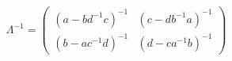\begin{equation}
\Lambda^{-1}= \left(
\begin{array}{cc}
(a-bd^{-1}c)^{-1} & (c-db^{-1}a)^{-1}\\
(b-ac^{-1}d)^{-1} & (d-ca^{-1}b)^{-1}
\end{array}
\right)    
\end{equation}


